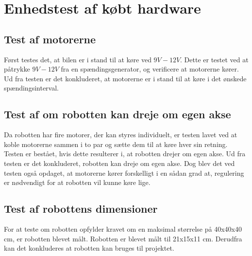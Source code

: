  \chapter{Enhedstest af købt hardware}
 \label{appendix:BilagTestKoebtHardware}
 
 \section{Test af motorerne}
 Først testes det, at bilen er i stand til at køre ved $9V - 12V$. Dette er testet ved at påtrykke $9V - 12V$ fra en spændingsgenerator, og verificere at motorerne kører.
 Ud fra testen er det konkluderet, at motorerne er i stand til at køre i det ønskede spændingsinterval. 
 
 \section{Test af om robotten kan dreje om egen akse}
 Da robotten har fire motorer, der kan styres individuelt, er testen lavet ved at koble motorerne sammen i to par og sætte dem til at køre hver sin retning. Testen er bestået, hvis dette resulterer i, at robotten drejer om egen akse.
 Ud fra testen er det konkluderet, robotten kan dreje om egen akse. Dog blev det ved testen også opdaget, at motorerne kører forskelligt i en sådan grad at, regulering er nødvendigt for at robotten vil kunne køre lige.
 
 \section{Test af robottens dimensioner}
 For at teste om robotten opfylder kravet om en maksimal størrelse på 40x40x40 cm, er robotten blevet målt. Robotten er blevet målt til 21x15x11 cm. Derudfra kan det konkluderes at robotten kan bruges til projektet.